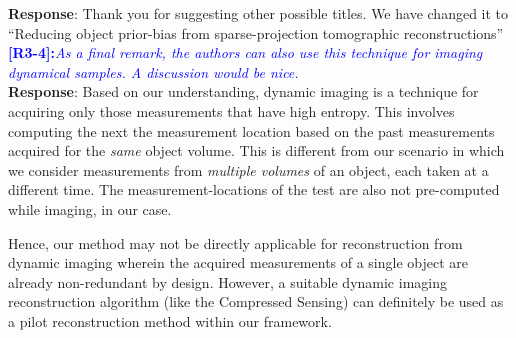 \documentclass{article}
\begin{document}
\textbf{Response}: Thank you for suggesting other possible titles. We have changed it to ``Reducing object prior-bias from sparse-projection tomographic reconstructions''\\


\textcolor{blue}{\textbf{[R3-4]:}\textit{As a final remark, the authors can also use this technique for imaging dynamical samples. A discussion would be nice.}}\\

\textbf{Response}: Based on our understanding, dynamic imaging is a technique for acquiring only those measurements that have high entropy. This involves computing the next the measurement location based on the past measurements acquired for the \textit{same} object volume. This is different from our scenario in which we consider measurements from \textit{multiple volumes} of an object, each taken at a different time. The measurement-locations of the test are also not pre-computed while imaging, in our case. 

Hence, our method may not be directly applicable for reconstruction from dynamic imaging wherein the acquired measurements of a single object are already non-redundant by design. However, a suitable dynamic imaging reconstruction algorithm (like the Compressed Sensing)  can definitely be used as a pilot reconstruction method within our framework. 



    
  
\end{document}
